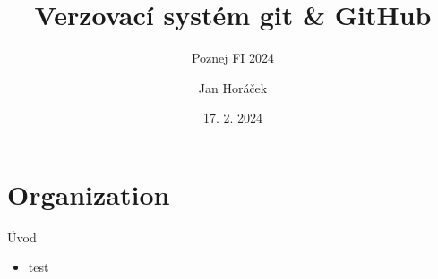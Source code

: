 \documentclass[
]{beamer}
\title{Verzovací systém git \& GitHub}
\subtitle{Poznej FI 2024}
\author[]{Jan Horáček}
\institute[FI MU]{Fakulta informatiky, Masarykova univerzita}
\date{17. 2. 2024}
\begin{document}
\begin{frame}[plain]
\maketitle
\end{frame}

\section{Organization}

\begin{frame}{Úvod}
\begin{itemize}
	\item test
\end{itemize}
\end{frame}
\end{document}
